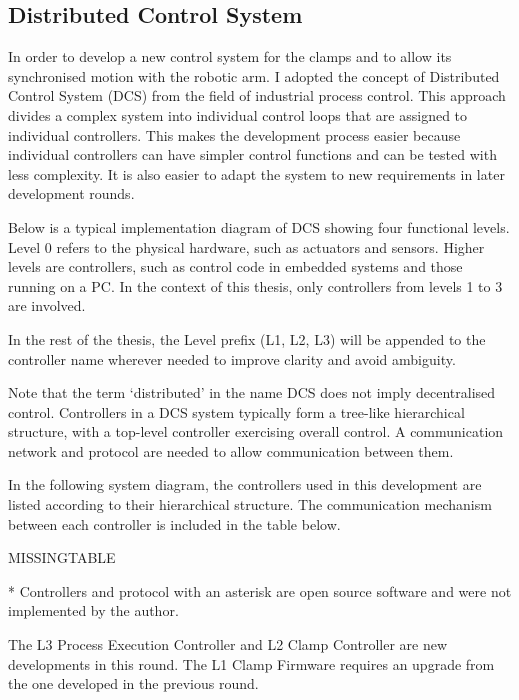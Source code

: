 \subsection{Distributed Control System}
\label{subsection:exploration-2-distributed-control-system}

In order to develop a new control system for the clamps and to allow its synchronised motion with the robotic arm. I adopted the concept of Distributed Control System (DCS) from the field of industrial process control. This approach divides a complex system into individual control loops that are assigned to individual controllers. This makes the development process easier because individual controllers can have simpler control functions and can be tested with less complexity. It is also easier to adapt the system to new requirements in later development rounds. 

Below is a typical implementation diagram of DCS showing four functional levels. Level 0 refers to the physical hardware, such as actuators and sensors. Higher levels are controllers, such as control code in embedded systems and those running on a PC. In the context of this thesis, only controllers from levels 1 to 3 are involved.

In the rest of the thesis, the Level prefix (L1, L2, L3) will be appended to the controller name wherever needed to improve clarity and avoid ambiguity.

Note that the term ‘distributed’ in the name DCS does not imply decentralised control. Controllers in a DCS system typically form a tree-like hierarchical structure, with a top-level controller exercising overall control. A communication network and protocol are needed to allow communication between them. 

In the following system diagram, the controllers used in this development are listed according to their hierarchical structure. The communication mechanism between each controller is included in the table below.

MISSINGTABLE

* Controllers and protocol with an asterisk are open source software and were not implemented by the author.

The L3 Process Execution Controller  and L2 Clamp Controller  are new developments in this round. The L1 Clamp Firmware  requires an upgrade from the one developed in the previous round. 

